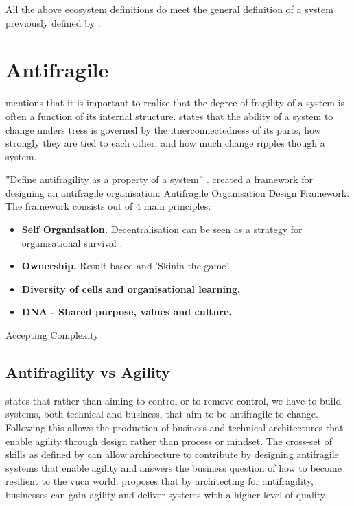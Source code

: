 All the above ecosystem definitions do meet the general definition of a system previously defined by \textcites{Ackoff1973}[p.~183]{Gharajedaghi2011}[p.~13--14]{Mannaert2016}.

\section{Antifragile}
\label{sec:tbantifragile}





\textcite[p.~886]{OReilly2019} mentions that it is important to realise that the degree of fragility of a system is often a function of its internal structure. \textcite[p.~886]{OReilly2019} states that the ability of a system to change unders tress is governed by the itnerconnectedness of its parts, how strongly they are tied to each other, and how much change ripples though a system.

''Define antifragility as a property of a system'' \parencite{Jaaron2014}. \textcite{Kastner2017} created a framework for designing an antifragile organisation: Antifragile Organisation Design Framework. The framework consists out of 4 main principles:
\begin{itemize}
	\item{\textbf{Self Organisation.} Decentralisation can be seen as a strategy for organisational survival \parencite{Brafman2007}.}
	\item{\textbf{Ownership.} Result based and 'Skinin the game'.}
	\item{\textbf{Diversity of cells and organisational learning.}}
	\item{\textbf{DNA - Shared purpose, values and culture.}}
\end{itemize}

Accepting Complexity 
\newpage


\newpage
\subsection{Antifragility vs Agility}
\label{tb:antifragile_vs_agility}
\textcite[Abstract]{OReilly2019} states that rather than aiming to control or to remove control, we have to build systems, both technical and business, that aim to be \gls{antifragile} to change. Following \textcite[Abstract]{OReilly2019} this allows the production of business and technical architectures that enable \gls{agility} through design rather than process or mindset. The cross-set of skills as defined by \textcite[p.~889]{OReilly2019} can allow architecture to contribute by designing \gls{antifragile} systems that enable \gls{agility} and answers the business question of how to become \gls{resilient} to the \acrshort{vuca} world. \textcite[p.~885]{OReilly2019} proposes that by architecting for \gls{antifragility}, businesses can gain \gls{agility} and deliver systems with a higher level of quality.

